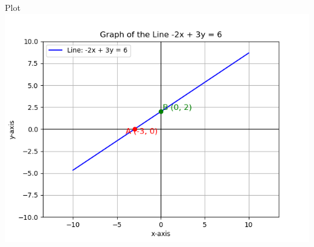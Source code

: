 \documentclass{beamer}
\begin{document}
\begin{frame}{Plot}
    \centering
    \includegraphics[width=\columnwidth, height=0.8\textheight, keepaspectratio]{Figure_6.png}     
\end{frame}
\end{document}
